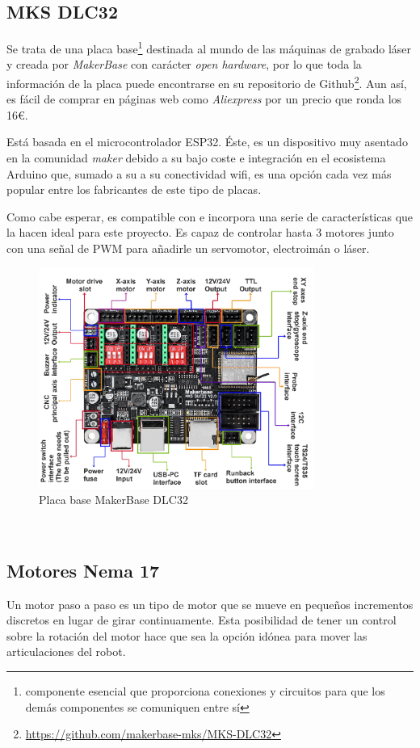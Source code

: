 \subsection{MKS DLC32}
\label{subsec:mksdlc32}
\noindent Se trata de una placa base\footnote{componente esencial que proporciona conexiones y circuitos para que los demás componentes se comuniquen entre sí} destinada al mundo de las máquinas de grabado láser y creada por \textit{MakerBase} con carácter \textit{open hardware}, por lo que toda la información de la placa 
puede encontrarse en su repositorio de Github\footnote{\url{https://github.com/makerbase-mks/MKS-DLC32}}. Aun así, es fácil de comprar 
en páginas web como \textit{Aliexpress} por un precio que ronda los 16\euro. 

Está basada en el 
microcontrolador ESP32. Éste, es un dispositivo muy asentado en la comunidad \textit{maker} debido a su bajo coste e integración en el 
ecosistema Arduino que, sumado a su a su conectividad wifi, es una opción cada vez más popular entre los fabricantes de este tipo de placas.

Como cabe esperar, es compatible con  e incorpora una serie de características que la hacen ideal para este proyecto. Es capaz de 
controlar hasta 3 motores junto con una señal de \acs{PWM} para añadirle un servomotor, electroimán o láser.
\begin{figure} [h!]
    \begin{center}
      \includegraphics[width=9cm]{figs/MKS.png}
    \end{center}
    \caption{Placa base MakerBase DLC32}
    \label{fig:robSoldering}
  \end{figure}\ 

\subsection{Motores Nema 17}
\label{subsec:motores}
\noindent Un motor paso a paso es un tipo de motor que se mueve en pequeños incrementos discretos en lugar de girar continuamente. Esta  
posibilidad de tener un control sobre la rotación del motor hace que sea la opción idónea para mover las articulaciones del robot.

